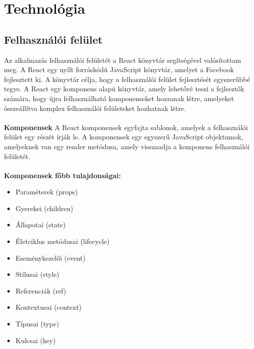 \chapter{Technol\'ogia}\label{chapter:technologia}
\section{Felhasználói felület}
Az alkalmazás felhasználói felületét a React könyvtár segítségével valósítottam meg.
A React egy nyílt forráskódú JavaScript könyvtár, amelyet a Facebook fejlesztett ki.
A könyvtár célja, hogy a felhasználói felület fejlesztését egyszerűbbé tegye.
A React egy komponens alapú könyvtár, amely lehetővé teszi a fejlesztők számára,
hogy újra felhasználható komponenseket hozzanak létre, amelyeket összeállítva
komplex felhasználói felületeket hozhatnak létre.
\\
\\
\textbf{Komponensek}
A React komponensek egyfajta sablonok, amelyek a felhasználói felület egy részét írják le.
A komponensek egy egyszerű JavaScript objektumok, amelyeknek van egy render metódusa,
amely visszaadja a komponens felhasználói felületét.
\\
\\
\textbf{Komponensek főbb tulajdonságai:}
\begin{itemize}
    \item Paraméterek (props)
    \item Gyerekei (children)
    \item Állapotai (state)
    \item Életciklus metódusai (lifecycle)
    \item Eseménykezelői (event)
    \item Stílusai (style)
    \item Referenciák (ref)
    \item Kontextusai (context)
    \item Típusai (type)
    \item Kulcsai (key)
\end{itemize}
